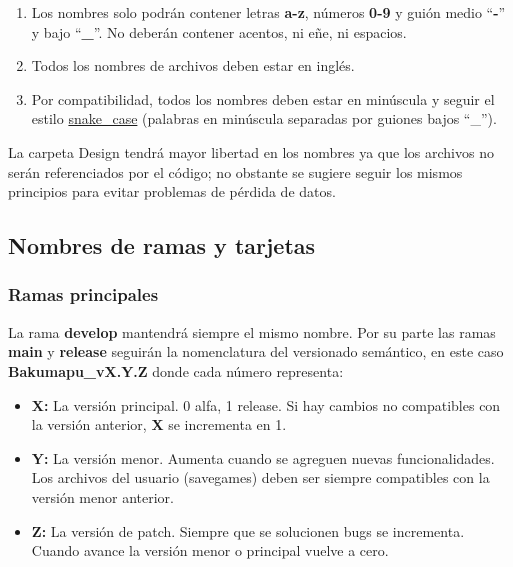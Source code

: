 \begin{enumerate}
  \item Los nombres solo podrán contener letras \textbf{a-z}, números \textbf{0-9} y guión medio “\textbf{-}” y bajo “\textbf{\_}”. No deberán contener acentos, ni eñe, ni espacios.
  
  \item Todos los nombres de archivos deben estar en inglés.
  
  \item Por compatibilidad, todos los nombres deben estar en minúscula y seguir el estilo \href{https://en.wikipedia.org/wiki/Snake_case}{snake\_case} (palabras en minúscula separadas por guiones bajos “\_”).
\end{enumerate}

La carpeta Design tendrá mayor libertad en los nombres ya que los archivos no serán referenciados por el código; no obstante se sugiere seguir los mismos principios para evitar problemas de pérdida de datos.


\subsection{Nombres de ramas y tarjetas}\label{organizacion:nombres-de-ramas}

\subsubsection{Ramas principales}\label{organizacion:ramas-principales}

La rama \textbf{develop} mantendrá siempre el mismo nombre. Por su parte las ramas \textbf{main} y \textbf{release} seguirán la nomenclatura del versionado semántico, en este caso \textbf{Bakumapu\_vX.Y.Z} donde cada número representa:

\begin{itemize}[label=-]
	\item \textbf{X:} La versión principal. 0 alfa, 1 release. Si hay cambios no compatibles con la versión anterior, \textbf{X} se incrementa en 1.
	
	\item \textbf{Y:} La versión menor. Aumenta cuando se agreguen nuevas funcionalidades. Los archivos del usuario (savegames) deben ser siempre compatibles con la versión menor anterior.
	
	\item \textbf{Z:} La versión de patch. Siempre que se solucionen bugs se incrementa. Cuando avance la versión menor o principal vuelve a cero.
\end{itemize}

